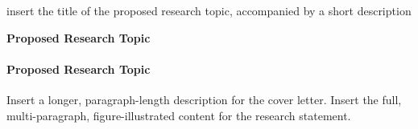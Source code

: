%
%
	{insert the title of the proposed research topic, accompanied by a short description}
	{%
			{{\bf Proposed Research Topic}\\}
			{\paragraph{{P}roposed {R}esearch {T}opic}}
		{Insert a longer, paragraph-length description for the cover letter.}
		{Insert the full, multi-paragraph, figure-illustrated content for the research statement.}
	}